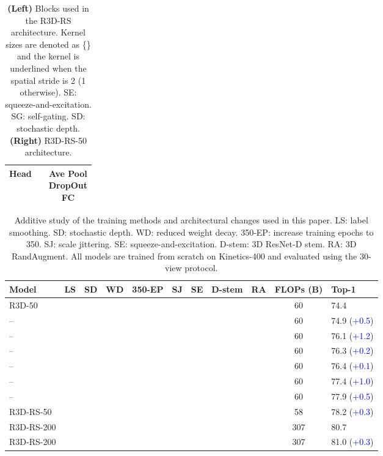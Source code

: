 \documentclass{article} \usepackage{iclr2021_conference,times}
\newcommand{\cmark}{\ding{51}}
\begin{document}
\begin{table}[t]
\begin{minipage}{.5\linewidth}
{\begin{tabular}{c | c  | c}
  \midrule
  Head &  & \makecell{Ave Pool \\ DropOut \\ FC} \\
  \bottomrule
\end{tabular}}
\end{minipage}
\vspace{1mm}
\caption{\small{
\textbf{(Left)} Blocks used in the R3D-RS architecture.
 Kernel sizes are denoted as \{\} and the kernel is underlined when the spatial stride is 2 (1 otherwise).
SE: squeeze-and-excitation. 
SG: self-gating. 
SD: stochastic depth.
\textbf{(Right)} R3D-RS-50 architecture.
}}
\label{tab:r50_spec} 
\end{table}


\begin{table*}[t]
\centering
\begin{tabular}{l | c c cccccc | c | l }
\toprule
Model    &  LS & SD &  WD & 350-EP & SJ & SE & D-stem & RA & FLOPs (B) & Top-1  \\ 
\midrule
R3D-50 &    &  &  &  &   &  &  & & 60 & 74.4 \\ 
-- &  \cmark &  &  &  &  &  & & & 60 & 74.9  (\textcolor{blue}{+0.5}) \\ 
-- & \cmark & \cmark &  &  & & &  &  & 60 & 76.1 (\textcolor{blue}{+1.2}) \\ 
-- & \cmark & \cmark & \cmark & & & &  & & 60 & 76.3 (\textcolor{blue}{+0.2})  \\ 
-- & \cmark & \cmark & \cmark & \cmark & &&  &  & 60 & 76.4 (\textcolor{blue}{+0.1}) \\ 
-- & \cmark & \cmark & \cmark & \cmark & \cmark & & & & 60 & 77.4 (\textcolor{blue}{+1.0}) \\ 
-- & \cmark & \cmark & \cmark & \cmark & \cmark & \cmark  & &  & 60 & 77.9 (\textcolor{blue}{+0.5}) \\ 
R3D-RS-50 & \cmark & \cmark & \cmark & \cmark & \cmark & \cmark &  \cmark & & 58& 78.2 (\textcolor{blue}{+0.3}) \\
\midrule
R3D-RS-200 & \cmark & \cmark & \cmark & \cmark & \cmark & \cmark &  \cmark & & 307& 80.7 \\
R3D-RS-200 & \cmark & \cmark & \cmark & \cmark & \cmark & \cmark &  \cmark & \cmark & 307& 81.0 (\textcolor{blue}{+0.3})\\
\bottomrule
\end{tabular}
\vspace{1mm}
\caption{\small{
Additive study of the training methods and architectural changes used in this paper. LS: label smoothing. SD: stochastic depth. WD: reduced weight decay. 350-EP: increase training epochs to 350. SJ: scale jittering. SE: squeeze-and-excitation. D-stem: 3D ResNet-D stem. RA: 3D RandAugment. 
All models are trained from scratch on Kinetics-400 and evaluated using the 30-view protocol.}}
\label{tab:ablation_study} 
\end{table*}
\end{document}
